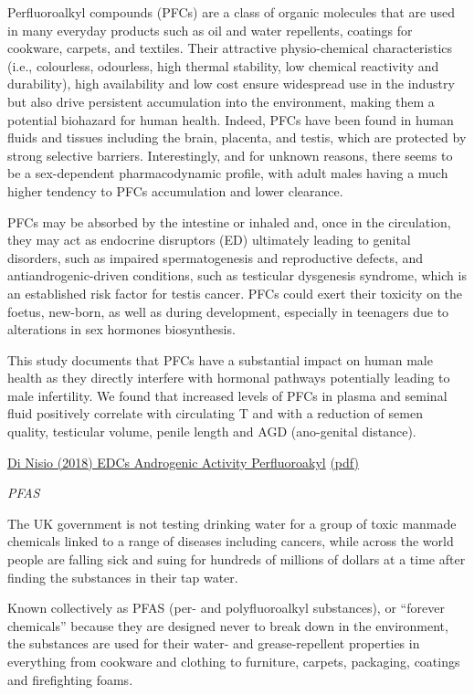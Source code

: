 \documentclass[
]{book}
\begin{document}
Perfluoroalkyl compounds (PFCs) are a class of organic molecules that are used in many
everyday products such as oil and water repellents, coatings for cookware, carpets, and
textiles. Their attractive physio-chemical characteristics (i.e., colourless, odourless, high
thermal stability, low chemical reactivity and durability), high availability and low cost
ensure widespread use in the industry but also drive persistent accumulation into the
environment, making them a potential biohazard for human health.
Indeed, PFCs have been found in human fluids and tissues including
the brain, placenta, and testis, which are protected by strong selective barriers.
Interestingly, and for unknown reasons, there
seems to be a sex-dependent pharmacodynamic profile, with adult males having a much
higher tendency to PFCs accumulation and lower clearance.

PFCs may be absorbed by the intestine or inhaled and,
once in the circulation, they may act as endocrine disruptors (ED) ultimately leading to
genital disorders, such as impaired spermatogenesis and reproductive defects, and
antiandrogenic-driven conditions, such as testicular dysgenesis syndrome, which is an
established risk factor for testis cancer.
PFCs could exert their toxicity on the foetus,
new-born, as well as during development, especially in teenagers due to alterations in sex
hormones biosynthesis.

This study documents that PFCs have a substantial impact on human male health as they
directly interfere with hormonal pathways potentially leading to male infertility. We found
that increased levels of PFCs in plasma and seminal fluid positively correlate with circulating
T and with a reduction of semen quality, testicular volume, penile length and AGD (ano-genital distance).

\href{https://www.documentcloud.org/documents/5316830-EDCs-Androgenic-Activity-Perfluoroakyl.html}{Di Nisio (2018) EDCs Androgenic Activity Perfluoroakyl}
\href{pdf/Di_Nisio_2018_EDCs-Androgenic-Activity-Perfluoroakyl.pdf}{(pdf)}

\emph{PFAS}

The UK government is not testing drinking water for a group of toxic manmade chemicals linked to a range of diseases including cancers, while across the world people are falling sick and suing for hundreds of millions of dollars at a time after finding the substances in their tap water.

Known collectively as PFAS (per- and polyfluoroalkyl substances), or ``forever chemicals'' because they are designed never to break down in the environment, the substances are used for their water- and grease-repellent properties in everything from cookware and clothing to furniture, carpets, packaging, coatings and firefighting foams.
\end{document}
